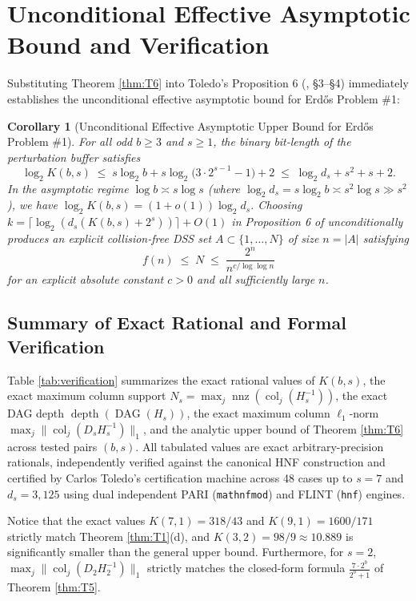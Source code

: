 \documentclass[11pt,a4paper]{article}
\theoremstyle{plain}
\newtheorem{corollary}[theorem]{Corollary}
\theoremstyle{definition}
\newcommand{\nnz}{\operatorname{nnz}}
\newcommand{\DAG}{\operatorname{DAG}}
\newcommand{\depth}{\operatorname{depth}}
\newcommand{\col}{\operatorname{col}}
\begin{document}
\section{Unconditional Effective Asymptotic Bound and Verification}

Substituting Theorem \ref{thm:T6} into Toledo's Proposition 6 (\cite{Toledo26}, \S 3--\S 4) immediately establishes the unconditional effective asymptotic bound for Erd\H{o}s Problem \#1:

\begin{corollary}[Unconditional Effective Asymptotic Upper Bound for Erd\H{o}s Problem \#1]\label{cor:asymptotic}
For all odd $b \ge 3$ and $s \ge 1$, the binary bit-length of the perturbation buffer satisfies
\[
\log_2 K(b,s) \;\le\; s \log_2 b + s \log_2\big(3 \cdot 2^{s-1} - 1\big) + 2 \;\le\; \log_2 d_s + s^2 + s + 2.
\]
In the asymptotic regime $\log b \asymp s \log s$ (where $\log_2 d_s = s \log_2 b \asymp s^2 \log s \gg s^2$), we have $\log_2 K(b,s) = (1 + o(1)) \log_2 d_s$. Choosing $k = \lceil \log_2(d_s(K(b,s) + 2^s)) \rceil + O(1)$ in Proposition 6 of \cite{Toledo26} unconditionally produces an explicit collision-free DSS set $A \subset \{1, \dots, N\}$ of size $n = |A|$ satisfying
\[
f(n) \;\le\; N \;\le\; \frac{2^n}{n^{c / \log\log n}}
\]
for an explicit absolute constant $c > 0$ and all sufficiently large $n$.
\end{corollary}

\subsection{Summary of Exact Rational and Formal Verification}

Table \ref{tab:verification} summarizes the exact rational values of $K(b,s)$, the exact maximum column support $N_s = \max_j \nnz(\col_j(H_s^{-1}))$, the exact DAG depth $\depth(\DAG(H_s))$, the exact maximum column $\ell_1$-norm $\max_j \|\col_j(D_s H_s^{-1})\|_1$, and the analytic upper bound of Theorem \ref{thm:T6} across tested pairs $(b,s)$. All tabulated values are exact arbitrary-precision rationals, independently verified against the canonical HNF construction and certified by Carlos Toledo's certification machine \cite{ToledoCert26} across 48 cases up to $s = 7$ and $d_s = 3{,}125$ using dual independent PARI (\texttt{mathnfmod}) and FLINT (\texttt{hnf}) engines.

Notice that the exact values $K(7,1) = 318/43$ and $K(9,1) = 1600/171$ strictly match Theorem \ref{thm:T1}(d), and $K(3,2) = 98/9 \approx 10.889$ is significantly smaller than the general upper bound. Furthermore, for $s = 2$, $\max_j \|\col_j(D_2 H_2^{-1})\|_1$ strictly matches the closed-form formula $\frac{7 \cdot 2^b}{2^b+1}$ of Theorem \ref{thm:T5}.
\end{document}
